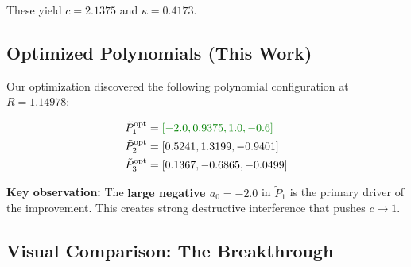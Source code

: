 \documentclass[11pt]{article}
\begin{document}
These yield $c = 2.1375$ and $\kappa = 0.4173$.

\subsection{Optimized Polynomials (This Work)}

Our optimization discovered the following polynomial configuration at $R = 1.14978$:

\begin{align}
\tilde{P}_1^{\text{opt}} &= \textcolor{improvement}{[-2.0, 0.9375, 1.0, -0.6]} \\
\tilde{P}_2^{\text{opt}} &= [0.5241, 1.3199, -0.9401] \\
\tilde{P}_3^{\text{opt}} &= [0.1367, -0.6865, -0.0499]
\end{align}

\textbf{Key observation:} The \textcolor{improvement}{\textbf{large negative $a_0 = -2.0$}} in $\tilde{P}_1$ is the primary driver of the improvement. This creates strong destructive interference that pushes $c \to 1$.

\subsection{Visual Comparison: The Breakthrough}
\end{document}
